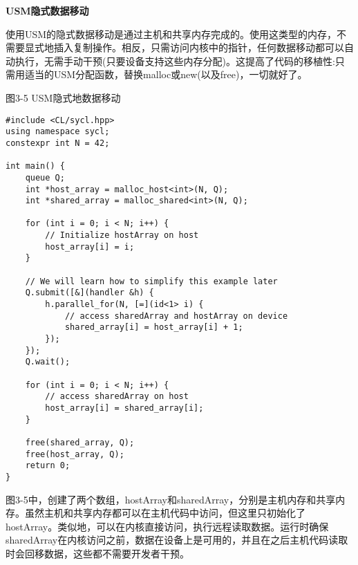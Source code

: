 \hspace*{\fill} \par %
\textbf{USM隐式数据移动}

使用USM的隐式数据移动是通过主机和共享内存完成的。使用这类型的内存，不需要显式地插入复制操作。相反，只需访问内核中的指针，任何数据移动都可以自动执行，无需手动干预(只要设备支持这些内存分配)。这提高了代码的移植性:只需用适当的USM分配函数，替换malloc或new(以及free)，一切就好了。\par

\hspace*{\fill} \par %
图3-5 USM隐式地数据移动
\begin{lstlisting}[caption={}]
#include <CL/sycl.hpp>
using namespace sycl;
constexpr int N = 42;

int main() {
	queue Q;
	int *host_array = malloc_host<int>(N, Q);
	int *shared_array = malloc_shared<int>(N, Q);
	
	for (int i = 0; i < N; i++) {
		// Initialize hostArray on host
		host_array[i] = i;
	}

	// We will learn how to simplify this example later
	Q.submit([&](handler &h) {
		h.parallel_for(N, [=](id<1> i) {
			// access sharedArray and hostArray on device
			shared_array[i] = host_array[i] + 1;
		});
	});
	Q.wait();
	
	for (int i = 0; i < N; i++) {
		// access sharedArray on host
		host_array[i] = shared_array[i];
	}

	free(shared_array, Q);
	free(host_array, Q);
	return 0;
}
\end{lstlisting}

图3-5中，创建了两个数组，hostArray和sharedArray，分别是主机内存和共享内存。虽然主机和共享内存都可以在主机代码中访问，但这里只初始化了hostArray。类似地，可以在内核直接访问，执行远程读取数据。运行时确保sharedArray在内核访问之前，数据在设备上是可用的，并且在之后主机代码读取时会回移数据，这些都不需要开发者干预。\par




















